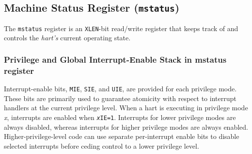 \subsection{Machine Status Register
(\texttt{mstatus})}\label{machine-status-register-mstatus}

The {\tt mstatus} register is an \texttt{XLEN}-bit read/write register that keeps track
of and controls the \emph{hart's} current operating state.

\subsubsection{Privilege and Global Interrupt-Enable Stack in mstatus register}

Interrupt-enable bits, \texttt{MIE}, \texttt{SIE}, and \texttt{UIE}, are provided for each
privilege mode. These bits are primarily used to guarantee atomicity
with respect to interrupt handlers at the current privilege level. When
a hart is executing in privilege mode \emph{x}, interrupts are enabled
when \texttt{\emph{x}IE=1}. Interrupts for lower privilege modes are always
disabled, whereas interrupts for higher privilege modes are always
enabled. Higher-privilege-level code can use separate per-interrupt
enable bits to disable selected interrupts before ceding control to a
lower privilege level.

